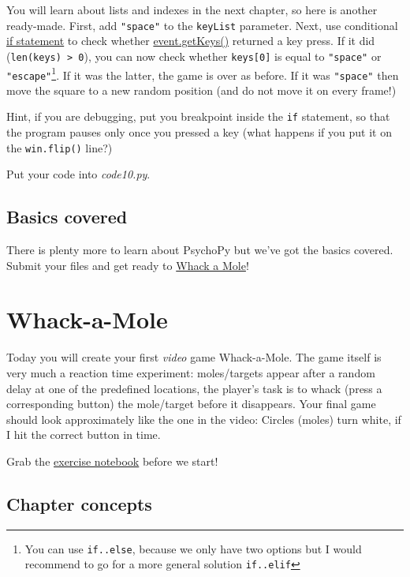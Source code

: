 \documentclass[
]{book}
\begin{document}
You will learn about lists and indexes in the next chapter, so here is another ready-made. First, add \texttt{"space"} to the \texttt{keyList} parameter. Next, use conditional \protect\hyperlink{ux5cux257Bux5cux23if-statement}{if statement} to check whether \href{https://psychopy.org/api/event.html\#psychopy.event.getKeys}{event.getKeys()} returned a key press. If it did (\texttt{len(keys)\ \textgreater{}\ 0}), you can now check whether \texttt{keys{[}0{]}} is equal to \texttt{"space"} or \texttt{"escape"}\footnote{You can use \texttt{if..else}, because we only have two options but I would recommend to go for a more general solution \texttt{if..elif}}. If it was the latter, the game is over as before. If it was \texttt{"space"} then move the square to a new random position (and do not move it on every frame!)

Hint, if you are debugging, put you breakpoint inside the \texttt{if} statement, so that the program pauses only once you pressed a key (what happens if you put it on the \texttt{win.flip()} line?)

Put your code into \emph{code10.py}.

\hypertarget{basics-covered}{%
\section{Basics covered}\label{basics-covered}}

There is plenty more to learn about PsychoPy but we've got the basics covered. Submit your files and get ready to \protect\hyperlink{whack-a-mole}{Whack a Mole}!

\hypertarget{whack-a-mole}{%
\chapter{Whack-a-Mole}\label{whack-a-mole}}

Today you will create your first \emph{video} game Whack-a-Mole. The game itself is very much a reaction time experiment: moles/targets appear after a random delay at one of the predefined locations, the player's task is to whack (press a corresponding button) the mole/target before it disappears. Your final game should look approximately like the one in the video: Circles (moles) turn white, if I hit the correct button in time.

Grab the \href{notebooks/Whack-a-mole.ipynb}{exercise notebook} before we start!

\hypertarget{chapter-concepts-4}{%
\section{Chapter concepts}\label{chapter-concepts-4}}
\end{document}
